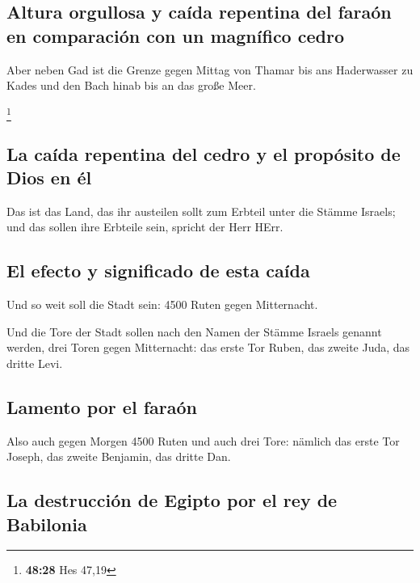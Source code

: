 \hypertarget{altura-orgullosa-y-cauxedda-repentina-del-farauxf3n-en-comparaciuxf3n-con-un-magnuxedfico-cedro}{%
\subsection{Altura orgullosa y caída repentina del faraón en comparación
con un magnífico
cedro}\label{altura-orgullosa-y-cauxedda-repentina-del-farauxf3n-en-comparaciuxf3n-con-un-magnuxedfico-cedro}}

 Aber neben Gad ist die Grenze gegen Mittag von Thamar
bis ans Haderwasser zu Kades und den Bach hinab bis an das große Meer.

\footnote{\textbf{48:28} Hes 47,19}

\hypertarget{la-cauxedda-repentina-del-cedro-y-el-propuxf3sito-de-dios-en-uxe9l}{%
\subsection{La caída repentina del cedro y el propósito de Dios en
él}\label{la-cauxedda-repentina-del-cedro-y-el-propuxf3sito-de-dios-en-uxe9l}}

 Das ist das Land, das ihr austeilen sollt zum Erbteil
unter die Stämme Israels; und das sollen ihre Erbteile sein, spricht der
Herr HErr.

\hypertarget{el-efecto-y-significado-de-esta-cauxedda}{%
\subsection{El efecto y significado de esta
caída}\label{el-efecto-y-significado-de-esta-cauxedda}}

 Und so weit soll die Stadt sein: 4500 Ruten gegen
Mitternacht.

 Und die Tore der Stadt sollen nach den Namen der Stämme
Israels genannt werden, drei Toren gegen Mitternacht: das erste Tor
Ruben, das zweite Juda, das dritte Levi.

\hypertarget{lamento-por-el-farauxf3n}{%
\subsection{Lamento por el faraón}\label{lamento-por-el-farauxf3n}}

 Also auch gegen Morgen 4500 Ruten und auch drei Tore:
nämlich das erste Tor Joseph, das zweite Benjamin, das dritte Dan.

\hypertarget{la-destrucciuxf3n-de-egipto-por-el-rey-de-babilonia}{%
\subsection{La destrucción de Egipto por el rey de
Babilonia}\label{la-destrucciuxf3n-de-egipto-por-el-rey-de-babilonia}}

